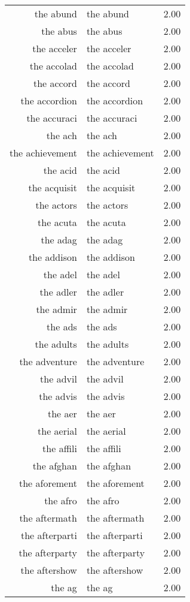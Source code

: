 \begin{table}[ht]
\begin{tabular}{rlr}
  the abund & the abund & 2.00 \\ 
  the abus & the abus & 2.00 \\ 
  the acceler & the acceler & 2.00 \\ 
  the accolad & the accolad & 2.00 \\ 
  the accord & the accord & 2.00 \\ 
  the accordion & the accordion & 2.00 \\ 
  the accuraci & the accuraci & 2.00 \\ 
  the ach & the ach & 2.00 \\ 
  the achievement & the achievement & 2.00 \\ 
  the acid & the acid & 2.00 \\ 
  the acquisit & the acquisit & 2.00 \\ 
  the actors & the actors & 2.00 \\ 
  the acuta & the acuta & 2.00 \\ 
  the adag & the adag & 2.00 \\ 
  the addison & the addison & 2.00 \\ 
  the adel & the adel & 2.00 \\ 
  the adler & the adler & 2.00 \\ 
  the admir & the admir & 2.00 \\ 
  the ads & the ads & 2.00 \\ 
  the adults & the adults & 2.00 \\ 
  the adventure & the adventure & 2.00 \\ 
  the advil & the advil & 2.00 \\ 
  the advis & the advis & 2.00 \\ 
  the aer & the aer & 2.00 \\ 
  the aerial & the aerial & 2.00 \\ 
  the affili & the affili & 2.00 \\ 
  the afghan & the afghan & 2.00 \\ 
  the aforement & the aforement & 2.00 \\ 
  the afro & the afro & 2.00 \\ 
  the aftermath & the aftermath & 2.00 \\ 
  the afterparti & the afterparti & 2.00 \\ 
  the afterparty & the afterparty & 2.00 \\ 
  the aftershow & the aftershow & 2.00 \\ 
  the ag & the ag & 2.00 \\ 

\end{tabular}
\end{table}
